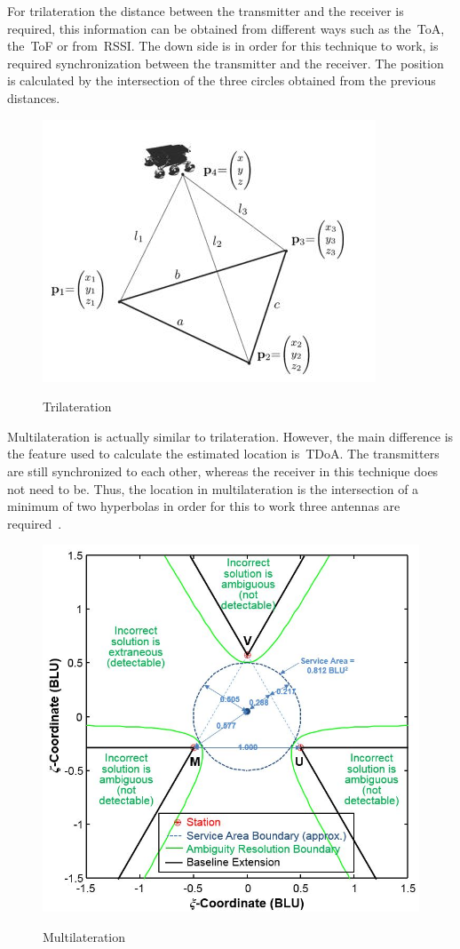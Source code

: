 For trilateration the distance between the transmitter and the receiver is required, this information can be obtained from different ways such as the~\gls{ToA}, the~\gls{ToF} or from~\gls{RSSI}. The down side is in order for this technique to work, is required synchronization between the transmitter and the receiver. The position is calculated by the intersection of the three circles obtained from the previous distances.\newline\newline\newline


\begin{figure}[htbp]
  \centering
  
    {\includegraphics[width=0.5\linewidth]{Chapters/Figures/trilateracao.JPG}}%
 
  \caption{Trilateration~\cite{Thomas2005}}
  \label{fig:Trilateration}
\end{figure}


Multilateration is actually  similar to trilateration. However, the main difference is the feature used to calculate the estimated location is~\gls{TDoA}. The transmitters are still synchronized to each other, whereas the receiver in this technique does not need to be. Thus, the location in multilateration is the intersection of a minimum of two hyperbolas in order for this to work three antennas are required~\cite{Fargas2017RL1}.

\begin{figure}[htbp]
  \centering
  
    {\includegraphics[width=0.5\linewidth]{Chapters/Figures/Multilateration.jpg}}%
 
  \caption{Multilateration~\cite{multilateration}}
  \label{fig:Multilateration}
\end{figure}


